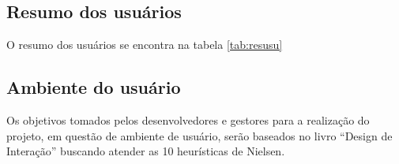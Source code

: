 \subsection{Resumo dos usuários}

O resumo dos usuários se encontra na tabela \ref{tab:resusu}

\begin{table}[!h]
\centering
\caption{Resumo dos usuários}
\label{tab:resusu}
\end{table}


\subsection{Ambiente do usuário}
Os objetivos tomados pelos desenvolvedores e gestores para a realização do projeto, em questão de ambiente de usuário, serão baseados no livro “Design de Interação” \cite{rogers2013design} buscando atender as 10 heurísticas de Nielsen.

